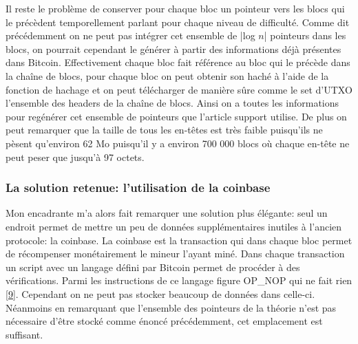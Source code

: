 \documentclass[12pt,a4paper]{article}
\newcommand{\source}[1]{\hyperlink{#1}{[#1]}}
\begin{document}
Il reste le problème de conserver pour chaque bloc un pointeur vers les blocs qui le précèdent temporellement parlant pour chaque niveau de difficulté. Comme dit précédemment on ne peut pas intégrer cet ensemble de |log $n$| pointeurs dans les blocs, on pourrait cependant le générer à partir des informations déjà présentes dans Bitcoin. Effectivement chaque bloc fait référence au bloc qui le précède dans la chaîne de blocs, pour chaque bloc on peut obtenir son haché à l'aide de la fonction de hachage et on peut télécharger de manière sûre comme le set d'UTXO l'ensemble des headers de la chaîne de blocs. Ainsi on a toutes les informations pour regénérer cet ensemble de pointeurs que l'article support utilise. De plus on peut remarquer que la taille de tous les en-têtes est très faible puisqu'ils ne pèsent qu'environ 62 Mo puisqu'il y a environ 700 000 blocs où chaque en-tête ne peut peser que jusqu'à 97 octets.\\ %

	\subsubsection{La solution retenue: l'utilisation de la coinbase} %

	Mon encadrante m'a alors fait remarquer une solution plus élégante: seul un endroit permet de mettre un peu de données supplémentaires inutiles à l'ancien protocole: la coinbase. La coinbase est la transaction qui dans chaque bloc permet de récompenser monétairement le mineur l'ayant miné. Dans chaque transaction un script avec un langage défini par Bitcoin permet de procéder à des vérifications. Parmi les instructions de ce langage figure OP\_NOP qui ne fait rien \source{9}. Cependant on ne peut pas stocker beaucoup de données dans celle-ci. Néanmoins en remarquant que l'ensemble des pointeurs de la théorie n'est pas nécessaire d'être stocké comme énoncé précédemment, cet emplacement est suffisant.%
	
\end{document}
